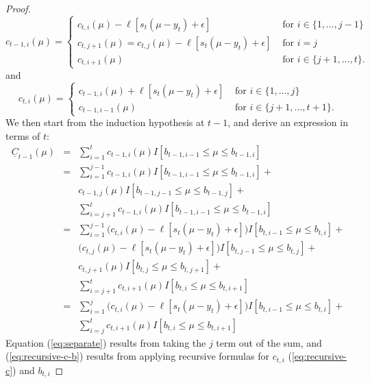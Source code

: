 \documentclass{article}
\begin{document}
\begin{proof}
\begin{equation}
    c_{t-1,i}(\mu)=
    \begin{cases}
      c_{t,i}(\mu)-\ell[s_t(\mu-y_t)+\epsilon] & \text{ for } i\in\{1,\dots, j-1\}\\
      c_{t,j+1}(\mu)=c_{t,j}(\mu)-\ell[s_t(\mu-y_t)+\epsilon] & \text{ for } i=j\\
      c_{t,i+1}(\mu) & \text{ for } i\in\{j+1, \dots, t\}.
    \end{cases}
  \label{eq:recursive-c}
  \end{equation}
and
\begin{equation}
  c_{t,i}(\mu)=
  \begin{cases}
    c_{t-1,i}(\mu)+\ell[s_t(\mu-y_t)+\epsilon] & \text{ for }i\in\{1,\dots,j\}\\
    c_{t-1,i-1}(\mu) & \text{ for }i\in\{j+1,\dots,t+1\}.
  \end{cases}
\end{equation}
We then start from the induction hypothesis at $t-1$, and derive an expression in terms of $t$:
\begin{eqnarray}
  \underline C_{t-1}(\mu) 
  &=& \sum_{i=1}^{t} c_{t-1,i}(\mu)I[b_{t-1,i-1}\leq\mu\leq b_{t-1,i}]\\
  &=& \sum_{i=1}^{j-1} c_{t-1,i}(\mu)I[b_{t-1,i-1}\leq \mu\leq b_{t-1,i}]+\nonumber\\
      &&c_{t-1,j}(\mu)I[b_{t-1,j-1}\leq\mu\leq b_{t-1,j}] +\nonumber\\
      &&\sum_{i=j+1}^{t} c_{t-1,i}(\mu)I[b_{t-1,i-1}\leq \mu\leq b_{t-1,i}]\label{eq:separate}\\
  &=& \sum_{i=1}^{j-1} \big(c_{t,i}(\mu)-\ell[s_t(\mu-y_t)+\epsilon]\big)I[b_{t,i-1}\leq\mu\leq b_{t,i}]+\nonumber\\
      &&\big(c_{t,j}(\mu)-\ell[s_t(\mu-y_t)+\epsilon]\big)I[b_{t,j-1}\leq\mu\leq b_{t,j}] +\nonumber\\
      &&c_{t,j+1}(\mu)I[b_{t,j}\leq\mu\leq b_{t,j+1}] +\nonumber\\
      &&\sum_{i=j+1}^{t} c_{t,i+1}(\mu)I[b_{t,i}\leq\mu\leq b_{t,i+1}]\label{eq:recursive-c-b}\\
  &=& \sum_{i=1}^{j} \big(c_{t,i}(\mu)-\ell[s_t(\mu-y_t)+\epsilon]\big)I[b_{t,i-1}\leq\mu\leq b_{t,i}]+\nonumber\\
      &&\sum_{i=j}^{t} c_{t,i+1}(\mu)I[b_{t,i}\leq \mu\leq b_{t,i+1}]
\end{eqnarray}
Equation (\ref{eq:separate}) results from taking the $j$ term out of
the sum, and (\ref{eq:recursive-c-b}) results from applying recursive
formulas for $c_{t,i}$ (\ref{eq:recursive-c}) and $b_{t,i}$

\end{proof}
\end{document}
